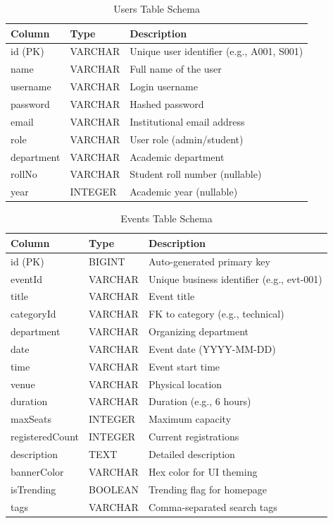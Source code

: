 \begin{table}[H]
\centering
\caption{Users Table Schema}
\label{tab:users_schema}
\begin{tabular}{|l|l|l|}
\hline
\textbf{Column} & \textbf{Type} & \textbf{Description} \\
\hline
id (PK) & VARCHAR & Unique user identifier (e.g., A001, S001) \\
\hline
name & VARCHAR & Full name of the user \\
\hline
username & VARCHAR & Login username \\
\hline
password & VARCHAR & Hashed password \\
\hline
email & VARCHAR & Institutional email address \\
\hline
role & VARCHAR & User role (admin/student) \\
\hline
department & VARCHAR & Academic department \\
\hline
rollNo & VARCHAR & Student roll number (nullable) \\
\hline
year & INTEGER & Academic year (nullable) \\
\hline
\end{tabular}
\end{table}

\begin{table}[H]
\centering
\caption{Events Table Schema}
\label{tab:events_schema}
\begin{tabular}{|l|l|l|}
\hline
\textbf{Column} & \textbf{Type} & \textbf{Description} \\
\hline
id (PK) & BIGINT & Auto-generated primary key \\
\hline
eventId & VARCHAR & Unique business identifier (e.g., evt-001) \\
\hline
title & VARCHAR & Event title \\
\hline
categoryId & VARCHAR & FK to category (e.g., technical) \\
\hline
department & VARCHAR & Organizing department \\
\hline
date & VARCHAR & Event date (YYYY-MM-DD) \\
\hline
time & VARCHAR & Event start time \\
\hline
venue & VARCHAR & Physical location \\
\hline
duration & VARCHAR & Duration (e.g., 6 hours) \\
\hline
maxSeats & INTEGER & Maximum capacity \\
\hline
registeredCount & INTEGER & Current registrations \\
\hline
description & TEXT & Detailed description \\
\hline
bannerColor & VARCHAR & Hex color for UI theming \\
\hline
isTrending & BOOLEAN & Trending flag for homepage \\
\hline
tags & VARCHAR & Comma-separated search tags \\
\hline
\end{tabular}
\end{table}

